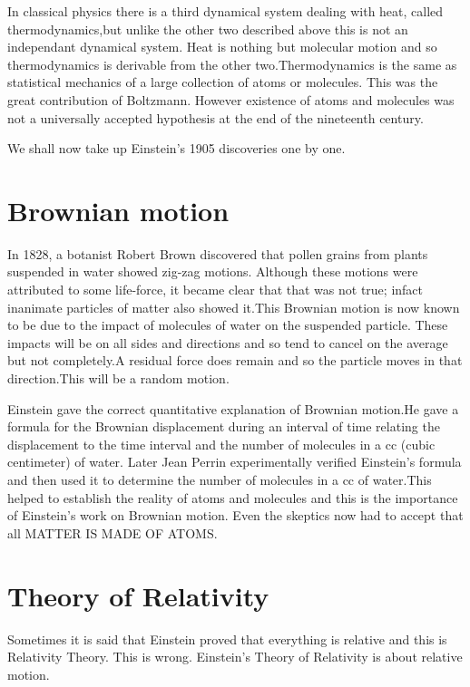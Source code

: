 In classical physics there is a third dynamical system dealing with
heat, called thermodynamics,but unlike the other two described above
this is not an independant dynamical system. Heat is nothing but
molecular motion and so thermodynamics is derivable from the other
two.Thermodynamics is the same as statistical mechanics of a large
collection of atoms or molecules. This was the great contribution
of Boltzmann. However existence of atoms and molecules was not a
universally accepted hypothesis at the end of the nineteenth
century.

We shall now take up Einstein's 1905 discoveries one by one.

\section*{Brownian motion}

In 1828, a botanist Robert Brown discovered that pollen grains
from plants suspended in water showed zig-zag motions. Although
these motions were attributed to some life-force, it became clear
that that was not true; infact inanimate particles of matter
also showed it.This Brownian motion is now known to be due to
the impact of molecules of water on the suspended particle.
These impacts will be on all sides and directions and so tend
to cancel on the average but not completely.A residual force
does remain and so the particle moves in that direction.This
will be a random motion.

\newpage

Einstein gave the correct quantitative explanation of Brownian
motion.He gave a formula for the Brownian displacement during an
interval of time relating the displacement to the time interval
and the number of molecules in a cc (cubic centimeter) of water.
Later Jean Perrin experimentally verified Einstein's formula
and then used it to determine the number of molecules in a
cc of water.This helped to establish the reality of atoms and
molecules and this is the importance of Einstein's work on
Brownian motion. Even the skeptics now had to accept that all
MATTER IS MADE OF ATOMS.

\section*{Theory of Relativity}

Sometimes it is said that Einstein proved that everything is
relative and this is Relativity Theory. This is wrong.
Einstein's Theory of Relativity is about relative motion.

